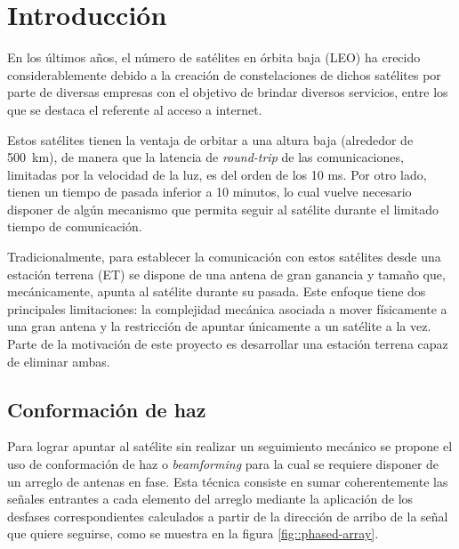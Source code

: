 \documentclass[../../main.tex]{subfiles}
\begin{document}
\graphicspath{{./figures}}
\chapter{Introducción}


En los últimos años, el número de satélites en órbita baja (LEO) ha crecido considerablemente debido a la creación de constelaciones de dichos satélites por parte de diversas empresas \cite{LeoConstellation} con el objetivo de brindar diversos servicios, entre los que se destaca el referente al acceso a internet. 

Estos satélites tienen la ventaja de orbitar a una altura baja (alrededor de 500~km), de manera que la latencia de \textit{round-trip} de las comunicaciones, limitadas por la velocidad de la luz, es del orden de los 10 ms. 
Por otro lado, tienen un tiempo de pasada inferior a 10 minutos, lo cual vuelve necesario disponer de algún mecanismo que permita seguir al satélite durante el limitado tiempo de comunicación.

Tradicionalmente, para establecer la comunicación con estos satélites desde una estación terrena (ET) se dispone de una antena de gran ganancia y tamaño que, mecánicamente, apunta al satélite durante su pasada.
Este enfoque tiene dos principales limitaciones: la complejidad mecánica asociada a mover físicamente a una gran antena y la restricción de apuntar únicamente a un satélite a la vez. Parte de la motivación de este proyecto es desarrollar una estación terrena capaz de eliminar ambas.


\section{Conformación de haz}

Para lograr apuntar al satélite sin realizar un seguimiento mecánico se propone el uso de conformación de haz o \textit{beamforming} para la cual se requiere disponer de un arreglo de antenas en fase. Esta técnica consiste en sumar coherentemente las señales entrantes a cada elemento del arreglo mediante la aplicación de los desfases correspondientes calculados a partir de la dirección de arribo de la señal que quiere seguirse, como se muestra en la figura \ref{fig::phased-array}.
\end{document}
